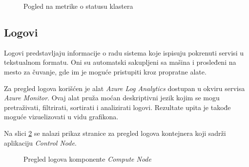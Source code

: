 \documentclass[12pt,oneside]{memoir}
\begin{document}
\begin{figure}[!ht]
  \centering
  \caption{Pogled na metrike o statusu klastera}
  \label{fig:clusterunhealthy}
\end{figure}

\subsection{Logovi}

Logovi predstavljaju informacije o radu sistema koje ispisuju pokrenuti servisi u tekstualnom formatu. Oni su automatski sakupljeni sa mašina i prosleđeni na mesto za čuvanje, gde im je moguće pristupiti kroz propratne alate.

Za pregled logova korišćen je alat \emph{Azure Log Analytics} dostupan u okviru servisa \emph{Azure Monitor}. Ovaj alat pruža moćan deskriptivni jezik kojim se mogu pretraživati, filtrirati, sortirati i analizirati logovi. Rezultate upita je takođe moguće vizuelizovati u vidu grafikona.

Na slici \ref{fig:computenodelogs} se nalazi prikaz stranice za pregled logova kontejnera koji sadrži aplikaciju \emph{Control Node}.

\begin{figure}[!ht]
  \centering
  \caption{Pregled logova komponente \emph{Compute Node}}
  \label{fig:computenodelogs}
\end{figure}
\end{document}
